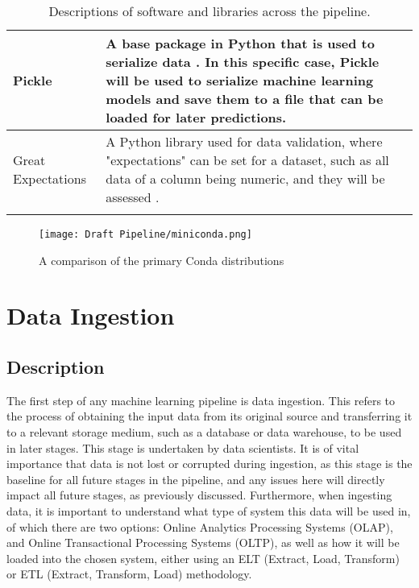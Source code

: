 \begin{longtable}{ |p{}| p{}|}
    \hline
    Pickle &
    A base package in Python that is used to serialize data \autocite{python_pickle_nodate}.
    In this specific case, Pickle will be used to serialize machine learning models and save them 
    to a file that can be loaded for later predictions.\\
    \hline
    Great Expectations &
    A Python library used for data validation, where "expectations" can be set for a dataset, such as 
    all data of a column being numeric, and they will be assessed \autocite{gx_gx_nodate}.\\
    \hline
\caption{Descriptions of software and libraries across the pipeline.}\label{tab:softwareDescriptions}
\end{longtable}

\begin{figure}[H]
    \centering
    \texttt{[image: Draft Pipeline/miniconda.png]}
    \caption{A comparison of the primary Conda distributions \autocite{towardsdatascience_getting_2021}}
    \label{fig:Miniconda}
\end{figure}

\pagebreak

\section{Data Ingestion}\label{sec:Ingestion}
\subsection{Description}
The first step of any machine learning pipeline is data ingestion. This refers to the process of obtaining the input data from its original source
and transferring it to a relevant storage medium, such as a database or data warehouse, to be used in later stages. This stage 
is undertaken by data scientists. 
It is of vital importance that data is not lost or corrupted during ingestion, as this stage is the baseline for all future stages in the pipeline, and any issues
here will directly impact all future stages, as previously discussed. Furthermore, when ingesting data, it is important to understand what type of system this data 
will be used in, of which there are two options: Online Analytics Processing Systems (OLAP), and Online Transactional Processing Systems (OLTP), as well 
as how it will be loaded into the chosen system, either using an ELT (Extract, Load, Transform) or ETL (Extract, Transform, Load) methodology.

